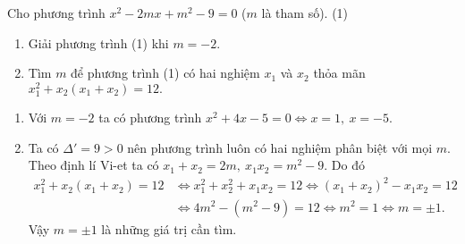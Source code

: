 \begin{ex}%
   Cho phương trình $x^2-2mx+m^2-9=0$ ($m$ là tham số). \hfill (1)
   \begin{enumerate}
   \item Giải phương trình (1) khi $m = -2$.
\item Tìm $m$ để phương trình (1) có hai nghiệm $x_1 $ và $x_2 $ thỏa mãn $x_1^2+x_2(x_1+x_2)=12.$
   \end{enumerate}
\loigiai
    {\begin{enumerate}
    \item Với $m=-2$ ta có phương trình $x^2+4x-5=0\Leftrightarrow x=1,\ x=-5. $
    \item Ta có $\Delta'=9>0$ nên phương trình luôn có hai nghiệm phân biệt với mọi $m$. Theo định lí Vi-et ta có $x_1+x_2=2m,\ x_1x_2=m^2-9$. Do đó
$$\begin{aligned}
    x_1^2+x_2(x_1+x_2)=12& \Leftrightarrow x_1^2+x_2^2+x_1x_2=12  \Leftrightarrow \left(x_1+x_2 \right)^2-x_1x_2=12 \\& \Leftrightarrow 4m^2-(m^2-9)=12 \Leftrightarrow m^2=1 \Leftrightarrow m= \pm 1.
    \end{aligned}$$
    Vậy $m=\pm 1$ là những giá trị cần tìm.
    \end{enumerate}
       }
\end{ex}

